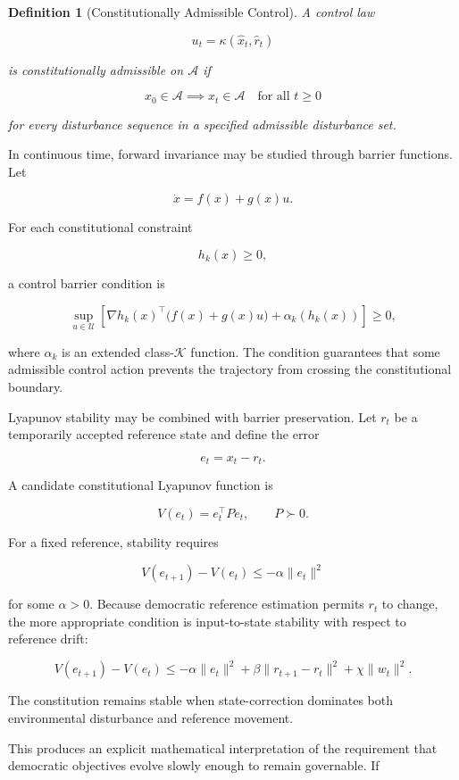 \documentclass[12pt,a4paper]{article}
\newtheorem{definition}{Definition}
\begin{document}
\begin{definition}[Constitutionally Admissible Control]
A control law

\[
u_t=\kappa(\hat{x}_t,\hat{r}_t)
\]

is constitutionally admissible on \(\mathcal{A}\) if

\[
x_0\in\mathcal{A}
\implies
x_t\in\mathcal{A}
\quad
\text{for all }t\geq 0
\]

for every disturbance sequence in a specified admissible disturbance set.
\end{definition}

In continuous time, forward invariance may be studied through barrier functions. Let

\[
\dot{x}=f(x)+g(x)u.
\]

For each constitutional constraint

\[
h_k(x)\geq 0,
\]

a control barrier condition is

\[
\sup_{u\in\mathcal{U}}
\left[
\nabla h_k(x)^{\top}
\bigl(f(x)+g(x)u\bigr)
+
\alpha_k(h_k(x))
\right]
\geq 0,
\]

where \(\alpha_k\) is an extended class-\(\mathcal{K}\) function. The condition guarantees that some admissible control action prevents the trajectory from crossing the constitutional boundary.

Lyapunov stability may be combined with barrier preservation. Let \(r_t\) be a temporarily accepted reference state and define the error

\[
e_t=x_t-r_t.
\]

A candidate constitutional Lyapunov function is

\[
V(e_t)
=
e_t^{\top}Pe_t,
\qquad
P\succ 0.
\]

For a fixed reference, stability requires

\[
V(e_{t+1})-V(e_t)
\leq
-\alpha\|e_t\|^2
\]

for some \(\alpha>0\). Because democratic reference estimation permits \(r_t\) to change, the more appropriate condition is input-to-state stability with respect to reference drift:

\[
V(e_{t+1})-V(e_t)
\leq
-\alpha\|e_t\|^2
+
\beta\|r_{t+1}-r_t\|^2
+
\chi\|w_t\|^2.
\]

The constitution remains stable when state-correction dominates both environmental disturbance and reference movement.

This produces an explicit mathematical interpretation of the requirement that democratic objectives evolve slowly enough to remain governable. If
\end{document}
